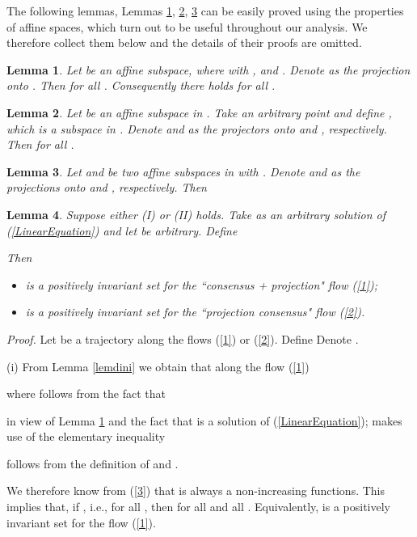\documentclass[a4paper, 11pt]{article}
\newtheorem{lemma}{Lemma}
\begin{document}
The following lemmas, Lemmas \ref{lem:affineprojection}, \ref{lem:subspace-affine-projection}, \ref{lem:doubleprojection} can be easily proved using the properties of affine spaces, which turn out to be useful throughout our analysis. We therefore collect them below and the details of their proofs are omitted.
\begin{lemma}\label{lem:affineprojection}
Let  be an affine subspace, where  with , and . Denote  as the projection onto . Then  for all . Consequently there holds  for all .
\end{lemma}
\begin{lemma}\label{lem:subspace-affine-projection}
Let  be an affine subspace in . Take an arbitrary point  and define , which is a subspace in .  Denote   and  as the projectors onto  and , respectively. Then  for all .
\end{lemma}
\begin{lemma}\label{lem:doubleprojection}
Let  and  be two affine subspaces in  with . Denote  and   as the projections onto  and , respectively. Then 
\end{lemma}
\begin{lemma}\label{lem:invariant}
Suppose either (I) or (II) holds. Take  as an arbitrary solution of (\ref{LinearEquation}) and let  be arbitrary.  Define

Then \begin{itemize}
\item[(i)]  is a positively invariant set for the ``consensus + projection" flow (\ref{1});
    \item[(ii)]   is a positively invariant set for the ``projection consensus" flow (\ref{2}).
\end{itemize}
\end{lemma}
{\it Proof.} Let  be a trajectory along the flows (\ref{1}) or (\ref{2}).  Define 
Denote .

\noindent (i) From Lemma \ref{lemdini} we obtain that along the flow (\ref{1})

where  follows from the fact that

in view of Lemma \ref{lem:affineprojection} and the fact that  is a solution of (\ref{LinearEquation});  makes use of the elementary inequality

 follows from the definition of  and .

We therefore know from (\ref{3}) that  is always a non-increasing functions. This implies that,  if , i.e.,   for all , then   for all  and all . Equivalently,   is a positively invariant set for the flow (\ref{1}).
\end{document}
